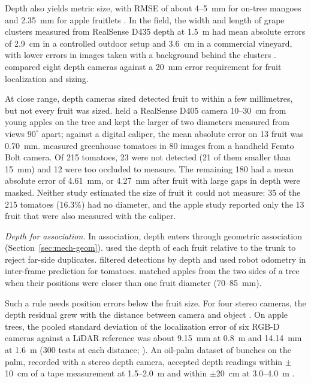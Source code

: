 Depth also yields metric size, with RMSE of about 4--5~mm for on-tree mangoes \citep{wang2017tree} and 2.35~mm for apple fruitlets \citep{sapkota2024immature}. In the field, the width and length of grape clusters measured from RealSense D435 depth at 1.5~m had mean absolute errors of 2.9~cm in a controlled outdoor setup and 3.6~cm in a commercial vineyard, with lower errors in images taken with a background behind the clusters \citep{kurtser2020field}. \citet{neupane2021evaluation} compared eight depth cameras against a 20~mm error requirement for fruit localization and sizing.

At close range, depth cameras sized detected fruit to within a few millimetres, but not every fruit was sized. \citet{fukuda2024measuring} held a RealSense D405 camera 10--30~cm from young apples on the tree and kept the larger of two diameters measured from views $90^\circ$ apart; against a digital caliper, the mean absolute error on 13 fruit was 0.70~mm. \citet{hao2024vision} measured greenhouse tomatoes in 80 images from a handheld Femto Bolt camera. Of 215 tomatoes, 23 were not detected (21 of them smaller than 15~mm) and 12 were too occluded to measure. The remaining 180 had a mean absolute error of 4.61~mm, or 4.27~mm after fruit with large gaps in depth were masked. Neither study estimated the size of fruit it could not measure: 35 of the 215 tomatoes (16.3\%) had no diameter, and the apple study reported only the 13 fruit that were also measured with the caliper.

\textit{Depth for association.} In association, depth enters through geometric association (Section~\ref{sec:mech-geom}). \citet{liu2019monocular} used the depth of each fruit relative to the trunk to reject far-side duplicates. \citet{zheng2025robust} filtered detections by depth and used robot odometry in inter-frame prediction for tomatoes. \citet{wei2025multi} matched apples from the two sides of a tree when their positions were closer than one fruit diameter (70--85~mm).

Such a rule needs position errors below the fruit size. For four stereo cameras, the depth residual grew with the distance between camera and object \citep{neupane2021evaluation}. On apple trees, the pooled standard deviation of the localization error of six RGB-D cameras against a LiDAR reference was about 9.15~mm at 0.8~m and 14.14~mm at 1.6~m (300 tests at each distance; \citealp{fu2026mt}). An oil-palm dataset of bunches on the palm, recorded with a stereo depth camera, accepted depth readings within $\pm$10~cm of a tape measurement at 1.5--2.0~m and within $\pm$20~cm at 3.0--4.0~m \citep{goh2025outdoor}.

